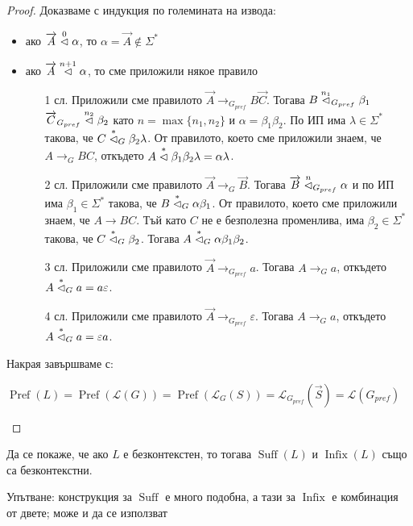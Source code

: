 \begin{proof}
    Доказваме с индукция по големината на извода:

    \begin{itemize}
        \item ако $\overrightarrow{A} \stackrel{0}{\vartriangleleft} \alpha$, то $\alpha = \overrightarrow{A} \notin \Sigma^*$ \checkmark
        \item ако $\overrightarrow{A} \stackrel{n + 1}{\vartriangleleft} \alpha$, то сме приложили някое правило
              \begin{itemize}
                  \item[1 сл.] Приложили сме правилото $\overrightarrow{A} \rightarrow_{G_{pref}} B \overrightarrow{C}$.
                      Тогава $B \stackrel{n_1}{\vartriangleleft}_{G_{pref}} \beta_1$ $\overrightarrow{C}_{G_{pref}} \stackrel{n_2}{\vartriangleleft} \beta_2$ като $n = \max \{ n_1, n_2 \}$ и $\alpha = \beta_1 \beta_2$.
                      По ИП има $\lambda \in \Sigma^*$ такова, че $C \stackrel{*}{\vartriangleleft}_G \beta_2 \lambda$.
                      От правилото, което сме приложили знаем, че $A \rightarrow_G BC$, откъдето $A \stackrel{*}{\vartriangleleft} \beta_1 \beta_2 \lambda = \alpha \lambda$.
                  \item[2 сл.] Приложили сме правилото $\overrightarrow{A} \rightarrow_G \overrightarrow{B}$.
                      Тогава $\overrightarrow{B} \stackrel{n}{\vartriangleleft}_{G_{pref}} \alpha$ и по ИП има $\beta_1 \in \Sigma^*$ такова, че $B \stackrel{*}{\vartriangleleft}_G \alpha \beta_1$.
                      От правилото, което сме приложили знаем, че $A \rightarrow BC$.
                      Тъй като $C$ не е безполезна променлива, има $\beta_2 \in \Sigma^*$ такова, че $C \stackrel{*}{\vartriangleleft}_G \beta_2$.
                      Тогава $A \stackrel{*}{\vartriangleleft}_G \alpha \beta_1 \beta_2$.
                  \item[3 сл.] Приложили сме правилото $\overrightarrow{A} \rightarrow_{G_{pref}} a$.
                      Тогава $A \rightarrow_G a$, откъдето $A \stackrel{*}{\vartriangleleft}_G a = a \varepsilon$.
                  \item[4 сл.] Приложили сме правилото $\overrightarrow{A} \rightarrow_{G_{pref}} \varepsilon$.
                      Тогава $A \rightarrow_G a$, откъдето $A \stackrel{*}{\vartriangleleft}_G a = \varepsilon a$.
              \end{itemize}
    \end{itemize}

    Накрая завършваме с:

    \begin{center}
        $\operatorname{Pref}(L) = \operatorname{Pref}(\mathcal{L}(G)) = \operatorname{Pref}(\mathcal{L}_G(S)) = \mathcal{L}_{G_{pref}}(\overrightarrow{S}) = \mathcal{L}(G_{pref})$
    \end{center}
\end{proof}

\begin{problem}
Да се покаже, че ако $L$ е безконтекстен, то тогава $\operatorname{Suff}(L)$ и $\operatorname{Infix}(L)$ също са безконтекстни.

Упътване: конструкция за $\operatorname{Suff}$ е много подобна, а тази за $\operatorname{Infix}$ е комбинация от двете; може и да се използват 
\end{problem}